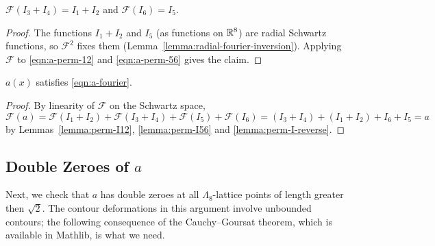 \begin{lemma}\label{lemma:perm-I-reverse}\leanok
$\mathcal{F}(I_3 + I_4) = I_1 + I_2$ and $\mathcal{F}(I_6) = I_5$.
\end{lemma}
\begin{proof}\leanok
The functions $I_1 + I_2$ and $I_5$ (as functions on $\mathbb{R}^8$) are radial Schwartz functions, so $\mathcal{F}^2$ fixes them (Lemma~\ref{lemma:radial-fourier-inversion}). Applying $\mathcal{F}$ to \eqref{eqn:a-perm-12} and \eqref{eqn:a-perm-56} gives the claim.
\end{proof}

\begin{proposition}\label{prop:a-fourier}
\leanok
$a(x)$ satisfies \eqref{eqn:a-fourier}.
\end{proposition}
\begin{proof}\leanok
By linearity of $\mathcal{F}$ on the Schwartz space,
\[
    \mathcal{F}(a) = \mathcal{F}(I_1 + I_2) + \mathcal{F}(I_3 + I_4) + \mathcal{F}(I_5) + \mathcal{F}(I_6)
    = (I_3 + I_4) + (I_1 + I_2) + I_6 + I_5 = a
\]
by Lemmas~\ref{lemma:perm-I12}, \ref{lemma:perm-I56} and \ref{lemma:perm-I-reverse}.
\end{proof}

\subsection{Double Zeroes of $a$}

Next, we check that $a$ has double zeroes at all $\Lambda_8$-lattice points of length greater then $\sqrt{2}$.
The contour deformations in this argument involve unbounded contours; the following consequence of the Cauchy--Goursat theorem, which is available in Mathlib, is what we need.

